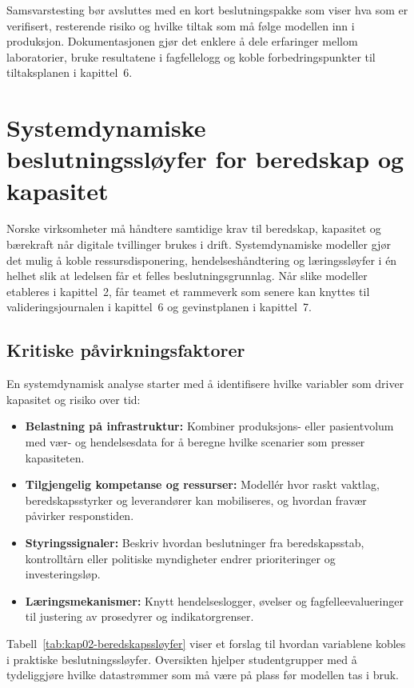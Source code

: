 Samsvarstesting bør avsluttes med en kort beslutningspakke som viser hva som er verifisert, resterende risiko og hvilke tiltak som
må følge modellen inn i produksjon. Dokumentasjonen gjør det enklere å dele erfaringer mellom laboratorier, bruke resultatene i
fagfellelogg og koble forbedringspunkter til tiltaksplanen i kapittel~6.

\section{Systemdynamiske beslutningssløyfer for beredskap og kapasitet}
Norske virksomheter må håndtere samtidige krav til beredskap, kapasitet og bærekraft når digitale tvillinger brukes i drift. Systemdynamiske modeller gjør det mulig å koble ressursdisponering, hendelseshåndtering og læringssløyfer i én helhet slik at ledelsen får et felles beslutningsgrunnlag.\citep{dsb2023nrb} Når slike modeller etableres i kapittel~2, får teamet et rammeverk som senere kan knyttes til valideringsjournalen i kapittel~6 og gevinstplanen i kapittel~7.

\subsection{Kritiske påvirkningsfaktorer}
En systemdynamisk analyse starter med å identifisere hvilke variabler som driver kapasitet og risiko over tid:
\begin{itemize}
    \item \textbf{Belastning på infrastruktur:} Kombiner produksjons- eller pasientvolum med vær- og hendelsesdata for å beregne hvilke scenarier som presser kapasiteten.\citep{helsedir2023nasjonalberedskap}
    \item \textbf{Tilgjengelig kompetanse og ressurser:} Modellér hvor raskt vaktlag, beredskapsstyrker og leverandører kan mobiliseres, og hvordan fravær påvirker responstiden.
    \item \textbf{Styringssignaler:} Beskriv hvordan beslutninger fra beredskapsstab, kontrolltårn eller politiske myndigheter endrer prioriteringer og investeringsløp.
    \item \textbf{Læringsmekanismer:} Knytt hendelseslogger, øvelser og fagfelleevalueringer til justering av prosedyrer og indikatorgrenser.
\end{itemize}

Tabell~\ref{tab:kap02-beredskapssløyfer} viser et forslag til hvordan variablene kobles i praktiske beslutningssløyfer. Oversikten hjelper studentgrupper med å tydeliggjøre hvilke datastrømmer som må være på plass før modellen tas i bruk.

